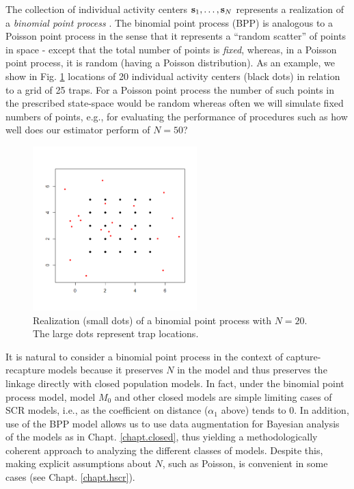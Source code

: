 The collection of individual activity centers ${\bf s}_{1},\ldots,
{\bf s}_{N}$ represents a realization of a {\it binomial point process}
\citep[][p. xyz]{illian_etal:2008}.  The binomial point process (BPP)
is analogous to a Poisson point process in the sense that it
represents a ``random scatter'' of points in space - except that the
total number of points is {\it fixed}, whereas, in a Poisson point
process, it is random (having a Poisson distribution).  As an example,
we show in Fig. \ref{scr0.fig.bpp} locations of 20 individual activity
centers (black dots) in relation to a grid of 25 traps. For a Poisson
point process the number of such points in the prescribed state-space
would be random whereas often we will simulate fixed numbers of
points, e.g., for evaluating the performance of procedures such as how
well does our estimator perform of $N=50$?
\begin{figure}
\begin{center}
\includegraphics[height=2.5in]{Ch4/figs/binomialpoint}
\end{center}
\caption{Realization (small dots) of a binomial point process with $N=20$. The
  large dots represent trap locations.}
\label{scr0.fig.bpp}
\end{figure}

It is natural to consider a binomial point process in the context of
capture-recapture models because it preserves $N$ in the model and thus
preserves the linkage directly with closed population models. In fact,
under the binomial point process model, model $M_0$ and other closed
models are simple limiting cases of SCR models, i.e., as the
coefficient on distance ($\alpha_1$ above) tends to 0.
In addition, use of
the BPP model allows us to use data augmentation for Bayesian analysis
of the models as in Chapt. \ref{chapt.closed}, thus yielding a methodologically
coherent approach to analyzing the different classes of
models. Despite this, making explicit assumptions about $N$, such as
Poisson, is convenient in some cases (see Chapt. \ref{chapt.hscr}).

